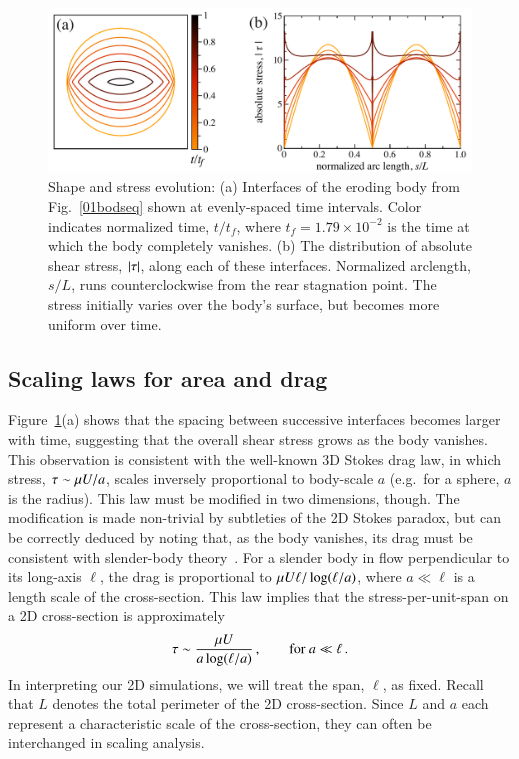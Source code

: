 \documentclass[preprint, 10pt]{elsarticle}
\begin{document}
\begin{figure}%
\begin{center}
\includegraphics[width = 0.8 \textwidth]{./figs/shrink_intface.pdf}
\caption{
Shape and stress evolution: (a) Interfaces of the eroding body from Fig.~\ref{01bodseq} shown at evenly-spaced time intervals. Color indicates normalized time, $t/t_f$, where $t_f = 1.79 \times 10^{-2}$ is the time at which the body completely vanishes. (b) The distribution of absolute shear stress, $\lvert \tau \rvert$, along each of these interfaces. Normalized arclength, $s/L$, runs counterclockwise from the rear stagnation point. The stress initially varies over the body's surface, but becomes more uniform over time.}
\label{shrink_intface}
\end{center}
\end{figure}

\subsection{Scaling laws for area and drag}
\label{sec:scaling}

Figure~\ref{shrink_intface}(a) shows that the spacing between successive interfaces becomes larger with time, suggesting that the overall shear stress grows as the body vanishes. This observation is consistent with the well-known 3D Stokes drag law, in which stress, $\tau \sim \mu U / a$, scales inversely proportional to body-scale $a$ (e.g.~for a sphere, $a$ is the radius). This law must be modified in two dimensions, though. The modification is made non-trivial by subtleties of the 2D Stokes paradox, but can be correctly deduced by noting that, as the body vanishes, its drag must be consistent with slender-body theory~\cite{batchelor1970slender, MooreJFM2012}. 
For a slender body in flow perpendicular to its long-axis $\ell$, the drag is proportional to
$\mu U \ell/ \log(\ell/a)$, where $a \ll \ell $ is a length scale of the cross-section. This law implies that the stress-per-unit-span on a 2D cross-section is approximately
\begin{align}
  \label{eqn:stresslaw}
  \tau \sim \frac{\mu U}{a \log(\ell/a)}\, , \qquad \text{for } a \ll \ell \, .
\end{align}
In interpreting our 2D simulations, we will treat the span, $\ell$, as
fixed. Recall that $L$ denotes the total perimeter of the 2D cross-section. Since $L$ and $a$ each represent a characteristic scale of the cross-section, they can often be interchanged in scaling analysis.
\end{document}
